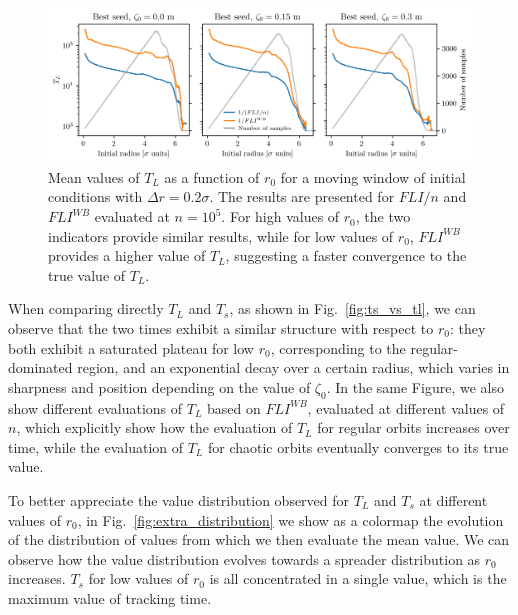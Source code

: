 \begin{figure}
    \centering
    \includegraphics[width=1\textwidth]{6_lhc_dynamic_indicators/figs/lyapunov_time_vs_lyapunov_wb_time.png}
    \caption{Mean values of $T_L$ as a function of $r_0$ for a moving window of initial conditions with $\Delta r = 0.2\sigma$. The results are presented for $FLI/n$ and $FLI^{{WB}}$ evaluated at $n=10^5$. For high values of $r_0$, the two indicators provide similar results, while for low values of $r_0$, $FLI^{{WB}}$ provides a higher value of $T_L$, suggesting a faster convergence to the true value of $T_L$.}
    \label{fig:lyapunov_time_fli_vs_wb}
\end{figure}

When comparing directly $T_L$ and $T_s$, as shown in Fig.~\ref{fig:ts_vs_tl}, we can observe that the two times exhibit a similar structure with respect to $r_0$: they both exhibit a saturated plateau for low $r_0$, corresponding to the regular-dominated region, and an exponential decay over a certain radius, which varies in sharpness and position depending on the value of $\zeta_0$. In the same Figure, we also show different evaluations of $T_L$ based on $FLI^{WB}$, evaluated at different values of $n$, which explicitly show how the evaluation of $T_L$ for regular orbits increases over time, while the evaluation of $T_L$ for chaotic orbits eventually converges to its true value.

To better appreciate the value distribution observed for $T_L$ and $T_s$ at different values of $r_0$, in Fig.~\ref{fig:extra_distribution} we show as a colormap the evolution of the distribution of values from which we then evaluate the mean value. We can observe how the value distribution evolves towards a spreader distribution as $r_0$ increases. $T_s$ for low values of $r_0$ is all concentrated in a single value, which is the maximum value of tracking time.   

